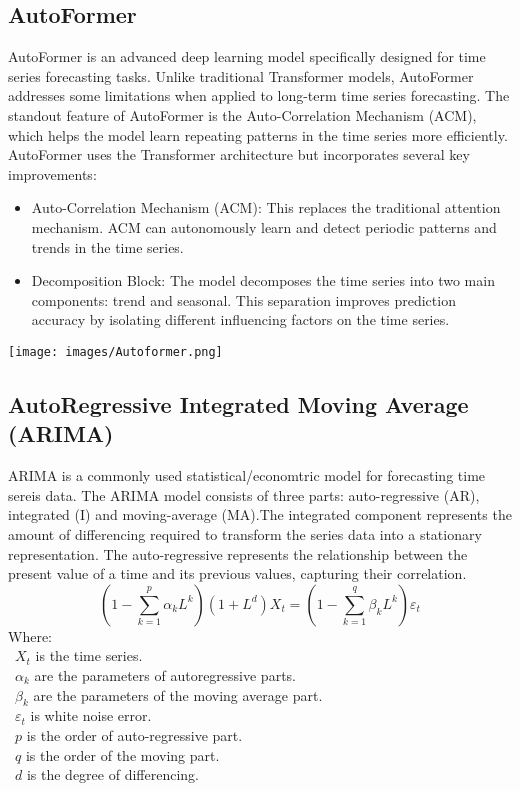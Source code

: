 \documentclass{ieeeojies}
\begin{document}
\subsection{AutoFormer}
AutoFormer is an advanced deep learning model specifically designed for time series forecasting tasks. Unlike traditional Transformer models, AutoFormer addresses some limitations when applied to long-term time series forecasting. The standout feature of AutoFormer is the Auto-Correlation Mechanism (ACM), which helps the model learn repeating patterns in the time series more efficiently.
AutoFormer uses the Transformer architecture but incorporates several key improvements:
\begin{itemize}
    \item Auto-Correlation Mechanism (ACM): This replaces the traditional attention mechanism. ACM can autonomously learn and detect periodic patterns and trends in the time series.
\end{itemize}
\begin{itemize}
    \item Decomposition Block: The model decomposes the time series into two main components: trend and seasonal. This separation improves prediction accuracy by isolating different influencing factors on the time series.
\end{itemize}
\texttt{[image: images/Autoformer.png]}
\subsection{AutoRegressive Integrated
Moving Average (ARIMA)} 
ARIMA is a commonly used statistical/economtric model for forecasting time sereis data. The ARIMA model consists of three parts: auto-regressive (AR), integrated (I) and moving-average (MA).The integrated component represents
the amount of differencing required to transform the series data
into a stationary representation. The auto-regressive represents the relationship between the present value of a time and its previous values, capturing their correlation. 
\begin{equation*}
(1 - \sum_{k=1}^{p} \alpha_k L^k)(1 + L^d)X_t = (1 - \sum_{k=1}^{q} \beta_k L^k) \varepsilon_t
\end{equation*}
Where:\\
\indent \textbullet\ \(X_t\) is the time series.\\
\indent \textbullet\ \(\alpha_k\) are the parameters of autoregressive parts. \\
\indent \textbullet\ \(\beta_k\) are the parameters of the moving average part.\\
\indent \textbullet\ \(\varepsilon_t\) is white noise error.\\
\indent \textbullet\ \(p\) is the order of auto-regressive part.\\
\indent \textbullet\ \(q\) is the order of the moving part.\\
\indent \textbullet\ \(d\) is the degree of differencing.\\
\end{document}
